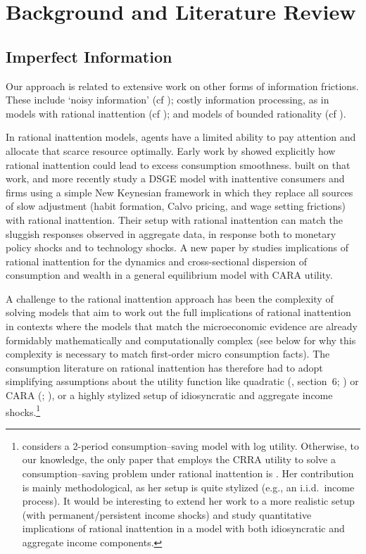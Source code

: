 \documentclass[titlepage]{./econtex}
\begin{document}
\hypertarget{Literature}{}
\section{Background and Literature Review}\label{sec:relation}

\hypertarget{Imperfect-Information}{}
\subsection{Imperfect Information}
Our approach is related to extensive work on other forms of information frictions. These include `noisy information' (cf \cite{pischkeMicroMacro}); costly information processing, as in models with rational inattention (cf \cite{simsInattention}); and models of bounded rationality (cf \cite{gabaixSparsityQJE}).

In rational inattention models, agents have a limited ability to pay attention and allocate that scarce resource optimally. Early work by \cite{reis:inattentive} showed explicitly how rational inattention could lead to excess consumption smoothness.
\cite{mw09:RI} built on that work, and more recently \cite{mackWiedREStud15} study a DSGE model with inattentive consumers and firms using a simple New Keynesian framework in which they replace all sources of slow adjustment (habit formation, Calvo pricing, and wage setting frictions) with rational inattention. Their setup with rational inattention can match the sluggish responses observed in aggregate data, in response both to monetary policy shocks and to technology shocks. A new paper by \cite{LuoRinGE} studies implications of rational inattention for the dynamics and cross-sectional dispersion of consumption and wealth in a general equilibrium model with CARA utility.

A challenge to the rational inattention approach has been the complexity of solving models that aim to work out the full implications of rational inattention in contexts where the models that match the microeconomic evidence are already formidably mathematically and computationally complex (see below for why this complexity is necessary to match first-order micro consumption facts).  The consumption literature on rational inattention has therefore had to adopt simplifying assumptions about the utility function like quadratic (\cite{simsInattention}, section~6; \cite{luo:inatC}) or CARA (\cite{LuoRinGE}; \cite{reis:inattentive}), or a highly stylized setup of idiosyncratic and aggregate income shocks.\footnote{\cite{sims_beyondLQ} considers a 2-period consumption--saving model with log utility. Otherwise, to our knowledge, the only paper that employs the CRRA utility to solve a consumption--saving problem under rational inattention is \cite{tutino_RIconsumption}. Her contribution is mainly methodological, as her setup is quite stylized (e.g., an i.i.d.\ income process).  It would be interesting to extend her work to a more realistic setup (with permanent/persistent income shocks) and study quantitative implications of rational inattention in a model with both idiosyncratic and aggregate income components.}
\end{document}
